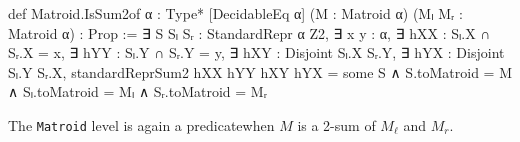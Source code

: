 \begin{leancode}
def Matroid.IsSum2of {α : Type*} [DecidableEq α]
    (M : Matroid α) (Mₗ Mᵣ : Matroid α) :
    Prop :=
  ∃ S Sₗ Sᵣ : StandardRepr α Z2,
  ∃ x y : α,
  ∃ hXX : Sₗ.X ∩ Sᵣ.X = {x},
  ∃ hYY : Sₗ.Y ∩ Sᵣ.Y = {y},
  ∃ hXY : Disjoint Sₗ.X Sᵣ.Y,
  ∃ hYX : Disjoint Sₗ.Y Sᵣ.X,
  standardReprSum2 hXX hYY hXY hYX = some S
  ∧ S.toMatroid = M
  ∧ Sₗ.toMatroid = Mₗ
  ∧ Sᵣ.toMatroid = Mᵣ
\end{leancode}
The \texttt{Matroid} level is again a predicate\EmDash when $M$ is a 2-sum of $M_{\ell}$ and $M_{r}$.
